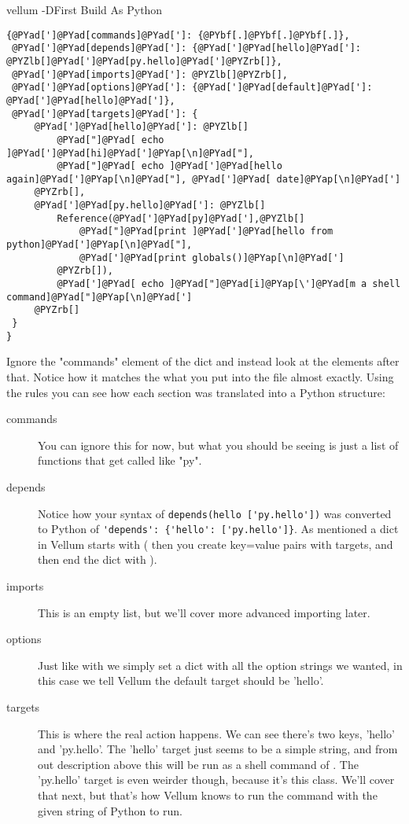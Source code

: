 \begin{code}{vellum -D}{First Build As Python}
\begin{Verbatim}[commandchars=@\[\]]
{@PYad[']@PYad[commands]@PYad[']: {@PYbf[.]@PYbf[.]@PYbf[.]},
 @PYad[']@PYad[depends]@PYad[']: {@PYad[']@PYad[hello]@PYad[']: @PYZlb[]@PYad[']@PYad[py.hello]@PYad[']@PYZrb[]},
 @PYad[']@PYad[imports]@PYad[']: @PYZlb[]@PYZrb[],
 @PYad[']@PYad[options]@PYad[']: {@PYad[']@PYad[default]@PYad[']: @PYad[']@PYad[hello]@PYad[']},
 @PYad[']@PYad[targets]@PYad[']: {
     @PYad[']@PYad[hello]@PYad[']: @PYZlb[]
         @PYad["]@PYad[ echo ]@PYad[']@PYad[hi]@PYad[']@PYap[\n]@PYad["],
         @PYad["]@PYad[ echo ]@PYad[']@PYad[hello again]@PYad[']@PYap[\n]@PYad["], @PYad[']@PYad[ date]@PYap[\n]@PYad[']
     @PYZrb[],
     @PYad[']@PYad[py.hello]@PYad[']: @PYZlb[]
         Reference(@PYad[']@PYad[py]@PYad['],@PYZlb[]
             @PYad["]@PYad[print ]@PYad[']@PYad[hello from python]@PYad[']@PYap[\n]@PYad["], 
             @PYad[']@PYad[print globals()]@PYap[\n]@PYad[']
         @PYZrb[]),
         @PYad[']@PYad[ echo ]@PYad["]@PYad[i]@PYap[\']@PYad[m a shell command]@PYad["]@PYap[\n]@PYad[']
     @PYZrb[]
 }
}
\end{Verbatim}

\end{code}

Ignore the "commands" element of the dict and instead look at the elements after
that.  Notice how it matches the what you put into the  file
almost exactly.  Using the rules you can see how each section was translated
into a Python structure:

\begin{description}

\item[commands] You can ignore this for now, but what you should be seeing is
    just a list of functions that get called like "py".
\item[depends] Notice how your syntax of \verb|depends(hello ['py.hello'])| was
    converted to Python of \verb|'depends': {'hello': ['py.hello']}|.  As mentioned
    a dict in Vellum starts with ( then you create key=value pairs with targets, and
    then end the dict with ).
\item[imports] This is an empty list, but we'll cover more advanced importing
    later.
\item[options] Just like with  we simply set a dict with all the
    option strings we wanted, in this case we tell Vellum the default target should
    be 'hello'.
\item[targets] This is where the real action happens.  We can see there's two
    keys, 'hello' and 'py.hello'.  The 'hello' target just seems to be a simple
    string, and from out description above this will be run as a shell command of
    .  The 'py.hello' target is even weirder though, because it's
    this  class.  We'll cover that next, but that's how Vellum
    knows to run the command  with the given string of Python to run.

\end{description}

